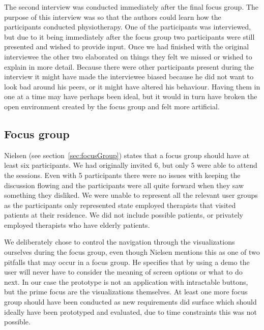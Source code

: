 The second interview was conducted immediately after the final focus group. The purpose of this interview was so that the authors could learn how the participants conducted physiotherapy. One of the participants was interviewed, but due to it being immediately after the focus group two participants were still presented and wished to provide input. Once we had finished with the original interviewee the other two elaborated on things they felt we missed or wished to explain in more detail. Because there were other participants present during the interview it might have made the interviewee biased because he did not want to look bad around his peers, or it might have altered his behaviour. Having them in one at a time may have perhaps been ideal, but it would in turn have broken the open environment created by the focus group and felt more artificial.

\subsection{Focus group}
Nielsen (see section~\ref{sec:focusGroup}) states that a focus group should have at least six participants. We had originally invited 6, but only 5 were able to attend the sessions. Even with 5 participants there were no issues with keeping the discussion flowing and the participants were all quite forward when they saw something they disliked. We were unable to represent all the relevant user groups as the participants only represented state employed therapists that visited patients at their residence. We did not include possible patients, or privately employed therapists who have elderly patients.

We deliberately chose to control the navigation through the visualizations ourselves during the focus group, even though Nielsen mentions this as one of two pitfalls that may occur in a focus group. He specifies that by using a demo the user will never have to consider the meaning of screen options or what to do next. In our case the prototype is not an application with intractable buttons, but the prime focus are the visualizations themselves. At least one more focus group should have been conducted as new requirements did surface which should ideally have been prototyped and evaluated, due to time constraints this was not possible.

